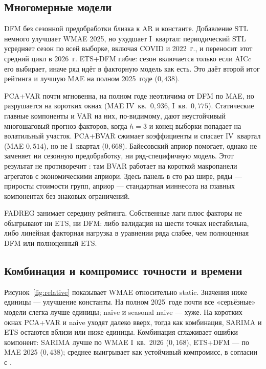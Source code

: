 \documentclass[12pt]{article}
\begin{document}
\subsection{Многомерные модели}

DFM без сезонной предобработки близка к AR и константе. Добавление STL немного улучшает WMAE 2025, но ухудшает I~квартал: периодический STL усредняет сезон по всей выборке, включая COVID и 2022~г., и переносит этот средний цикл в 2026~г. ETS+DFM гибче: сезон включается только если AICc его выбирает, иначе ряд идёт в факторную модель как есть. Это даёт второй итог рейтинга и лучшую MAE на полном 2025~годе ($0{,}438$).

PCA+VAR почти мгновенна, на полном годе неотличима от DFM по MAE, но разрушается на коротких окнах (MAE IV~кв.\ $0{,}936$, I~кв.\ $0{,}775$). Статические главные компоненты и VAR на них, по-видимому, дают неустойчивый многошаговый прогноз факторов, когда $h=3$ и конец выборки попадает на волатильный участок. PCA+BVAR сжимает коэффициенты и спасает IV~квартал (MAE $0{,}514$), но не I~квартал ($0{,}668$). Байесовский априор помогает, однако не заменяет ни сезонную предобработку, ни ряд-специфичную модель. Этот результат не противоречит \citet{deryugina2015,banbura2010,slabolitskiy2026}: там BVAR работает на короткой макропанели агрегатов с экономическими априори. Здесь панель в сто раз шире, ряды --- приросты стоимости групп, априор --- стандартная миннесота на главных компонентах без знаковых ограничений.

FADREG занимает середину рейтинга. Собственные лаги плюс факторы не обыгрывают ни ETS, ни DFM: либо валидация на шести точках нестабильна, либо линейная факторная нагрузка в уравнении ряда слабее, чем полноценная DFM или полноценный ETS.

\subsection{Комбинация и компромисс точности и времени}

Рисунок~\ref{fig:relative} показывает WMAE относительно static. Значения ниже единицы --- улучшение константы. На полном 2025~годе почти все «серьёзные» модели слегка лучше единицы; naive и seasonal naive --- хуже. На коротких окнах PCA+VAR и naive уходят далеко вверх, тогда как комбинация, SARIMA и ETS остаются вблизи или ниже единицы. Комбинация сглаживает ошибки компонент: SARIMA лучше по WMAE I~кв.~2026 ($0{,}168$), ETS+DFM --- по MAE 2025 ($0{,}438$); среднее выигрывает как устойчивый компромисс, в согласии с \citet{bates1969,timmermann2006}.
\end{document}
